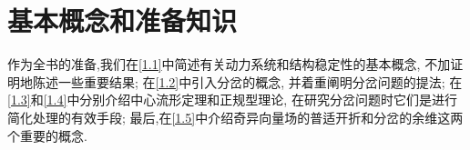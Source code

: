 \chapter{基本概念和准备知识}
作为全书的准备,我们在\ref{1.1}中简述有关动力系统和结构稳定性的基本概念,
不加证明地陈述一些重要结果;
在\ref{1.2}中引入分岔的概念,
并着重阐明分岔问题的提法;
在\ref{1.3}和\ref{1.4}中分别介绍中心流形定理和正规型理论,
在研究分岔问题时它们是进行简化处理的有效手段;
最后,在\ref{1.5}中介绍奇异向量场的普适开折和分岔的余维这两个重要的概念.
